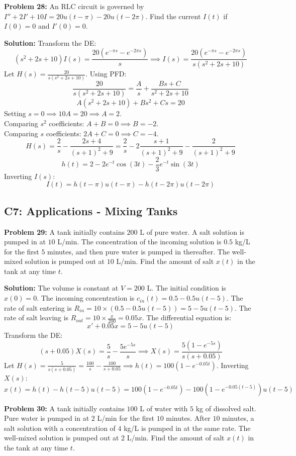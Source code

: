 \documentclass[11pt, letterpaper]{article}
\theoremstyle{definition}
\theoremstyle{remark}
\begin{document}
\vspace{1em}
\textbf{Problem 28:} An RLC circuit is governed by $I'' + 2I' + 10I = 20u(t-\pi) - 20u(t-2\pi)$. Find the current $I(t)$ if $I(0) = 0$ and $I'(0) = 0$.

\textbf{Solution:}
Transform the DE:
\[ (s^2+2s+10)I(s) = \frac{20(e^{-\pi s} - e^{-2\pi s})}{s} \implies I(s) = \frac{20(e^{-\pi s} - e^{-2\pi s})}{s(s^2+2s+10)} \]
Let $H(s) = \frac{20}{s(s^2+2s+10)}$. Using PFD:
\[ \frac{20}{s(s^2+2s+10)} = \frac{A}{s} + \frac{Bs+C}{s^2+2s+10} \]
\[ A(s^2+2s+10) + Bs^2 + Cs = 20 \]
Setting $s=0 \implies 10A = 20 \implies A = 2$. \\
Comparing $s^2$ coefficients: $A + B = 0 \implies B = -2$. \\
Comparing $s$ coefficients: $2A + C = 0 \implies C = -4$.
\[ H(s) = \frac{2}{s} - \frac{2s+4}{(s+1)^2+9} = \frac{2}{s} - 2\frac{s+1}{(s+1)^2+9} - \frac{2}{(s+1)^2+9} \]
\[ h(t) = 2 - 2e^{-t}\cos(3t) - \frac{2}{3}e^{-t}\sin(3t) \]
Inverting $I(s)$:
\[ I(t) = h(t-\pi)u(t-\pi) - h(t-2\pi)u(t-2\pi) \]

\subsection{C7: Applications - Mixing Tanks}

\textbf{Problem 29:} A tank initially contains $200$ L of pure water. A salt solution is pumped in at $10$ L/min. The concentration of the incoming solution is $0.5$ kg/L for the first $5$ minutes, and then pure water is pumped in thereafter. The well-mixed solution is pumped out at $10$ L/min. Find the amount of salt $x(t)$ in the tank at any time $t$.

\textbf{Solution:}
The volume is constant at $V = 200$ L. The initial condition is $x(0) = 0$.
The incoming concentration is $c_{in}(t) = 0.5 - 0.5u(t-5)$.
The rate of salt entering is $R_{in} = 10 \times (0.5 - 0.5u(t-5)) = 5 - 5u(t-5)$.
The rate of salt leaving is $R_{out} = 10 \times \frac{x}{200} = 0.05x$.
The differential equation is:
\[ x' + 0.05x = 5 - 5u(t-5) \]
Transform the DE:
\[ (s+0.05)X(s) = \frac{5}{s} - \frac{5e^{-5s}}{s} \implies X(s) = \frac{5(1 - e^{-5s})}{s(s+0.05)} \]
Let $H(s) = \frac{5}{s(s+0.05)} = \frac{100}{s} - \frac{100}{s+0.05} \implies h(t) = 100(1 - e^{-0.05t})$.
Inverting $X(s)$:
\[ x(t) = h(t) - h(t-5)u(t-5) = 100(1 - e^{-0.05t}) - 100(1 - e^{-0.05(t-5)})u(t-5) \]

\vspace{1em}
\textbf{Problem 30:} A tank initially contains $100$ L of water with $5$ kg of dissolved salt. Pure water is pumped in at $2$ L/min for the first $10$ minutes. After $10$ minutes, a salt solution with a concentration of $4$ kg/L is pumped in at the same rate. The well-mixed solution is pumped out at $2$ L/min. Find the amount of salt $x(t)$ in the tank at any time $t$.
\end{document}
